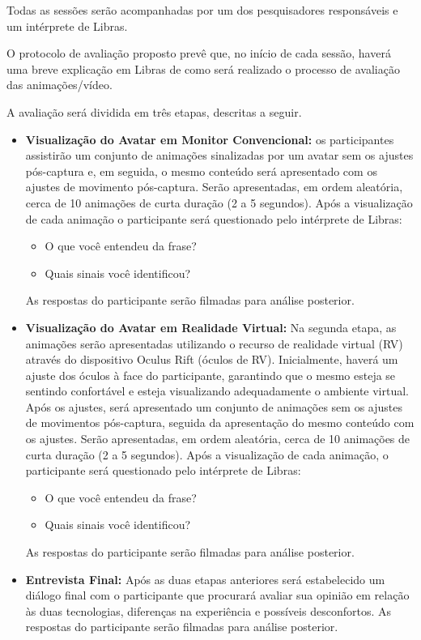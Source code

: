 \documentclass[a4paper,11pt,titlepage,singlespacing]{article}
\begin{document}
Todas as sessões serão acompanhadas por um dos pesquisadores responsáveis e um intérprete de Libras.

O protocolo de avaliação proposto prevê que, no início de cada sessão, haverá uma breve explicação em Libras de como será realizado o processo de avaliação das animações/vídeo.

A avaliação será dividida em três etapas, descritas a seguir.

\begin{itemize}
\item \textbf{Visualização do Avatar em Monitor Convencional:} os participantes assistirão um conjunto de animações sinalizadas por um avatar sem os ajustes pós-captura e, em seguida, o mesmo conteúdo será apresentado com os ajustes de movimento pós-captura. Serão apresentadas, em ordem aleatória, cerca de 10 animações de curta duração (2 a 5 segundos). Após a visualização de cada animação o participante será questionado pelo intérprete de Libras:
\begin{itemize}
\item O que você entendeu da frase?
\item Quais sinais você identificou?
\end{itemize}
As respostas do participante serão filmadas para análise posterior.

\item \textbf{Visualização do Avatar em Realidade Virtual:} 
Na segunda etapa, as animações serão apresentadas utilizando o recurso de realidade virtual (RV) através do dispositivo Oculus Rift (óculos de RV). 
Inicialmente, haverá um ajuste dos óculos à face do participante, garantindo que o mesmo esteja se sentindo confortável e esteja visualizando adequadamente o ambiente virtual. Após os ajustes, será apresentado um conjunto de animações sem os ajustes de movimentos pós-captura, seguida da apresentação do mesmo conteúdo com os ajustes. Serão apresentadas, em ordem aleatória, cerca de 10 animações de curta duração (2 a 5 segundos).
Após a visualização de cada animação, o participante será questionado pelo intérprete de Libras:
\begin{itemize}
\item O que você entendeu da frase?
\item Quais sinais você identificou?
\end{itemize}
As respostas do participante serão filmadas para análise posterior.

\item \textbf{Entrevista Final:} Após as duas etapas anteriores será estabelecido um diálogo final com o participante que procurará avaliar sua opinião em relação às duas tecnologias, diferenças na experiência e possíveis desconfortos. As respostas do participante serão filmadas para análise posterior.

\end{itemize}
\end{document}
